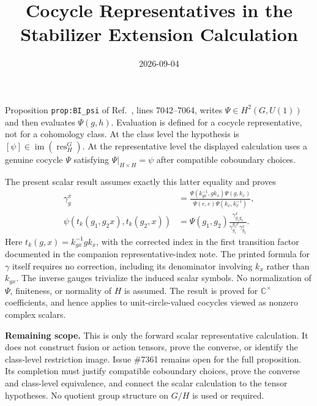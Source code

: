 \documentclass{article}
\title{Cocycle Representatives in the Stabilizer Extension Calculation}
\author{}
\date{2026-09-04}
\begin{document}
\maketitle
{}

Proposition \texttt{prop:BI\_psi} of
Ref.~\cite{FrancoRubio2025MPUGauging}, lines 7042--7064, writes
$\Psi\in H^2(G,U(1))$ and then evaluates $\Psi(g,h)$.
Evaluation is defined for a cocycle representative, not for a cohomology class.
At the class level the hypothesis is
$[\psi]\in\operatorname{im}(\operatorname{res}^G_H)$.
At the representative level the displayed calculation uses a genuine
cocycle $\Psi$ satisfying $\Psi|_{H\times H}=\psi$ after compatible
coboundary choices.

The present scalar result assumes exactly this latter equality and proves
\begin{align}
 \gamma_g^x&=\frac{\Psi(k_{gx}^{-1},gk_x)\Psi(g,k_x)}
 {\Psi(e,e)\Psi(k_x,k_x^{-1})},\\
 \psi(t_k(g_1,g_2x),t_k(g_2,x))
 &=\Psi(g_1,g_2)\frac{\gamma_{g_1g_2}^x}
 {\gamma_{g_1}^{g_2x}\gamma_{g_2}^x}.
\end{align}
Here $t_k(g,x)=k_{gx}^{-1}gk_x$, with the corrected index in the first
transition factor documented in the companion representative-index note.
The printed formula for $\gamma$ itself requires no correction, including
its denominator involving $k_x$ rather than $k_{gx}$.
The inverse gauges trivialize the induced scalar symbols.
No normalization of $\Psi$, finiteness, or normality of $H$ is assumed.
The result is proved for $\mathbb C^\times$ coefficients, and hence applies
to unit-circle-valued cocycles viewed as nonzero complex scalars.

\textbf{Remaining scope.}
This is only the forward scalar representative calculation. It does not
construct fusion or action tensors, prove the converse, or identify the
class-level restriction image. Issue \#7361 remains open for the full
proposition. Its completion must justify compatible coboundary choices,
prove the converse and class-level equivalence, and connect the scalar
calculation to the tensor hypotheses. No quotient group structure on
$G/H$ is used or required.



\end{document}
